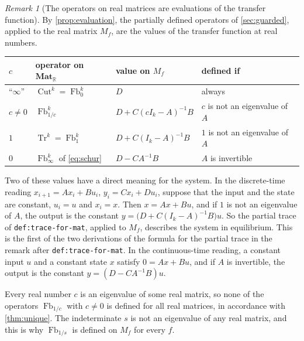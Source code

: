\documentclass[11pt,a4paper]{article}
\theoremstyle{plain}
\theoremstyle{definition}
\theoremstyle{remark}
\newtheorem{remark}[theorem]{Remark}
\DeclareMathOperator{\Fb}{Fb}
\DeclareMathOperator{\Tr}{Tr}
\DeclareMathOperator{\Cut}{Cut}
\newcommand{\R}{\mathbb{R}}
\newcommand{\Mat}{\mathbf{Mat}}
\newcommand{\lbl}[1]{\nolinkurl{#1}}
\begin{document}
\begin{remark}[The operators on real matrices are evaluations of the transfer function]
    \label{rem:table}
    By \cref{prop:evaluation}, the partially defined operators of \cref{sec:guarded}, applied to the real matrix $M_f$, are the values of the transfer function at real numbers.
    \begin{center}
        \begin{tabular}{llll}
            \toprule
            $c$           & operator on $\Mat_\R$                 & value on $M_f$              & defined if                        \\
            \midrule
            ``$\infty$''  & $\Cut^k = \Fb^k_0$                    & $D$                         & always                            \\
            $c \neq 0$    & $\Fb^k_{1/c}$                         & $D + C (c I_k - A)^{-1} B$  & $c$ is not an eigenvalue of $A$   \\
            $1$           & $\Tr^k = \Fb^k_1$                     & $D + C (I_k - A)^{-1} B$    & $1$ is not an eigenvalue of $A$   \\
            $0$           & $\Fb^k_\infty$ of \cref{eq:schur}     & $D - C A^{-1} B$            & $A$ is invertible                 \\
            \bottomrule
        \end{tabular}
    \end{center}
    Two of these values have a direct meaning for the system.
    In the discrete-time reading $x_{i+1} = A x_i + B u_i$, $y_i = C x_i + D u_i$, suppose that the input and the state are constant, $u_i = u$ and $x_i = x$.
    Then $x = A x + B u$, and if $1$ is not an eigenvalue of $A$, the output is the constant $y = \bigl( D + C (I_k - A)^{-1} B \bigr) u$.
    So the partial trace of \lbl{def:trace-for-mat}, applied to $M_f$, describes the system in equilibrium.
    This is the first of the two derivations of the formula for the partial trace in the remark after \lbl{def:trace-for-mat}.
    In the continuous-time reading, a constant input $u$ and a constant state $x$ satisfy $0 = A x + B u$, and if $A$ is invertible, the output is the constant $y = ( D - C A^{-1} B ) u$.

    Every real number $c$ is an eigenvalue of some real matrix, so none of the operators $\Fb_{1/c}$ with $c \neq 0$ is defined for all real matrices, in accordance with \cref{thm:unique}.
    The indeterminate $s$ is not an eigenvalue of any real matrix, and this is why $\Fb_{1/s}$ is defined on $M_f$ for every $f$.
\end{remark}
\end{document}
